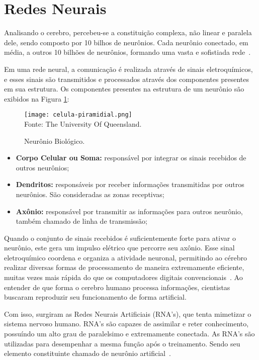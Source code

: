 \section{Redes Neurais}
    Analisando o cerebro, percebeu-se a constituição complexa, não linear e paralela dele, sendo composto por 10 bilhos de neurônios.
    Cada neurônio conectado, em média, a outros 10 bilhões de neurônios, formando uma vasta e sofistiada rede~\cite{haykin2009neural}.

    Em uma rede neural, a comunicação é realizada através de sinais eletroquímicos, e esses sinais são transmitidos 
    e processados através dos componentes presentes em sua estrutura. Os componentes presentes na estrutura de um neurônio 
    são exibidos na Figura \ref{fig:neuronio_biologico}:
    \begin{figure}[!htb]
        \centering
        \caption{Neurônio Biológico.}
        \texttt{[image: celula-piramidial.png]}\\
        {\footnotesize Fonte: The University Of Queensland.}\
        \label{fig:neuronio_biologico}
    \end{figure}
    
    \begin{itemize}
        \item \textbf{Corpo Celular ou Soma: }responsável por integrar os sinais recebidos de outros neurônios;
        \item \textbf{Dendritos: }responsáveis por receber informações transmitidas por outros neurônios. 
        São consideradas as zonas receptivas;
        \item \textbf{Axônio: }responsável por transmitir as informações para outros neurônio, também chamado de linha de 
        transmissão;
    \end{itemize}

    Quando o conjunto de sinais recebidos é suficientemente forte para ativar o neurônio, este gera um impulso elétrico 
    que percorre seu axônio. Esse sinal eletroquímico coordena e organiza a atividade neuronal, permitindo ao cérebro realizar 
    diversas formas de processamento de maneira extremamente eficiente, muitas vezes mais rápida do que os computadores digitais 
    convencionais~\cite{haykin2009neural}. Ao entender de que forma o cerebro humano processa informações, cientistas buscaram 
    reproduzir seu funcionamento de forma artificial.
    
    Com isso, surgiram as Redes Neurais Artificiais (RNA's), que tenta mimetizar o sistema nervoso humano. RNA's são capazes de
    assimilar e reter conhecimento, possuíndo um alto grau de paralelsimo e extremamente conectada. As RNA's são utilizadas para
    desempenhar a mesma função após o treinamento. Sendo seu elemento constituinte chamado de neurônio artificial~\cite{ulinick2019}.

